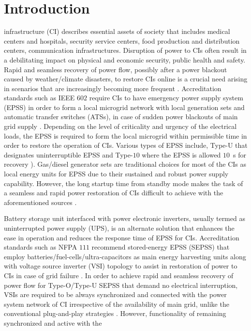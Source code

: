 \documentclass[journal]{IEEEtran}
\begin{document}
\section{Introduction}\label{intro}
 infrastructure (CI) describes essential assets of society that includes medical centers and hospitals, security service centers, food production and distribution centers, communication infrastructures. Disruption of power to CIs often result in a debilitating impact on physical and economic security, public health and safety. Rapid and seamless recovery of power flow, possibly after a power blackout caused by weather/climate disasters, to restore CIs online is a crucial need arising in scenarios that are increasingly becoming more frequent \cite{NOAA}. Accreditation standards such as IEEE $602$ require CIs to have emergency power supply system (EPSS) in order to form a local microgrid network with local generation sets and automatic transfer switches (ATSs), in case of sudden power blackouts of main grid supply \cite{ieee602}. Depending on the level of criticality and urgency of the electrical loads, the EPSS is required to form the local microgrid within permissible time in order to restore the operation of CIs. Various types of EPSS include, Type-$\mathrm{U}$ that designates uninterruptible EPSS and Type-$10$ where the EPSS is allowed $10$~s for recovery \cite{nfpa110}). Gas/diesel generator sets are traditional choices for most of the CIs as local energy units for EPSS due to their sustained and robust power supply capability. However, the long startup time from standby mode makes the task of a seamless and rapid power restoration of CIs difficult to achieve with the aforementioned sources \cite{ieee446}. 
\par Battery storage unit interfaced with power electronic inverters, usually termed as uninterrupted power supply (UPS), is an alternate solution that enhances the ease in operation and reduces the response time of EPSS for CIs. Accreditation standards such as NFPA $111$ recommend stored-energy EPSS (SEPSS) that employ batteries/fuel-cells/ultra-capacitors as main energy harvesting units along with voltage source inverter (VSI) topology to assist in restoration of power to CIs in case of grid failure \cite{nfpa111}. In order to achieve rapid and seamless recovery of power flow for Type-$\mathrm{O}$/Type-$\mathrm{U}$ SEPSS that demand no electrical interruption, VSIs are required to be always synchronized and connected with the power system network of CI irrespective of the availability of main grid, unlike the conventional plug-and-play strategies \cite{csCIu}. However, functionality of remaining synchronized and active with the
\end{document}
